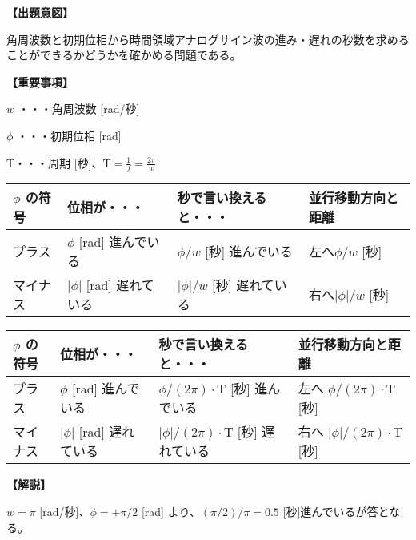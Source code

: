 \noindent \textbf{【出題意図】}

\noindent 角周波数と初期位相から時間領域アナログサイン波の進み・遅れの秒数を求めることができるかどうかを確かめる問題である。

\vspace{1em}
\noindent \textbf{【重要事項】}

\bigskip
\noindent $w$ ・・・角周波数 [rad/秒]

\bigskip
\noindent $\phi$ ・・・初期位相 [rad]

\bigskip
$\textrm{T}$・・・周期 [秒]、$\textrm{T} = \frac{1}{f} = \frac{2\pi}{w}$

\begin{center}
\begin{tabularx}{0.9\fbwidth}{|X|X|X|X|}
\hline
$\phi$ の符号&  位相が・・・   & 秒で言い換えると・・・   & 並行移動方向と距離 \\
\hline
プラス &  $\phi$ [rad] 進んでいる & $\phi/w$ [秒] 進んでいる & 左へ$\phi/w$ [秒] \\
\hline
マイナス &  $|\phi|$ [rad] 遅れている & $|\phi|/w$ [秒] 遅れている & 右へ$|\phi|/w$ [秒] \\
\hline
\end{tabularx}

\medskip
\begin{tabularx}{0.9\fbwidth}{|X|X|X|X|}
\hline
$\phi$ の符号&  位相が・・・   & 秒で言い換えると・・・   & 並行移動方向と距離 \\
\hline
プラス &  $\phi$ [rad] 進んでいる & $\phi/(2\pi) \cdot \textrm{T}$ [秒] 進んでいる & 左へ $\phi/(2\pi) \cdot \textrm{T}$ [秒] \\
\hline
マイナス &  $|\phi|$ [rad] 遅れている & $|\phi|/(2\pi) \cdot \textrm{T}$ [秒] 遅れている & 右へ $|\phi|/(2\pi) \cdot \textrm{T}$ [秒] \\
\hline
\end{tabularx}
\end{center}

\vspace{1em}
\noindent \textbf{【解説】}

\noindent $w = \pi$ [rad/秒]、$\phi = +\pi/2$ [rad] より、$(\pi/2)/\pi = 0.5$ [秒]進んでいるが答となる。
